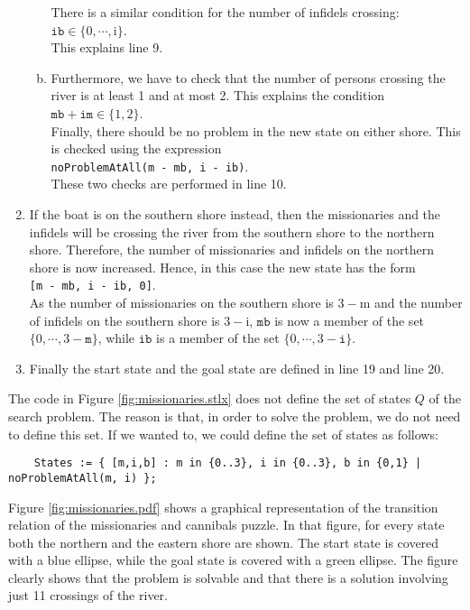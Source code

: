 \begin{enumerate}
\begin{enumerate}[(a)]
            There is a similar condition for the number of infidels crossing:
            \\[0.2cm]
            \hspace*{1.3cm}
            $\mathtt{ib} \in \{0,\cdots,\mathrm{i}\}$.
            \\[0.2cm]
            This explains line 9.
      \item Furthermore, we have to check that the number of persons crossing the river is at least 1
            and at most 2.  This explains the condition
            \\[0.2cm]
            \hspace*{1.3cm}
            $\mathtt{mb} + \mathtt{im} \in \{1,2\}$.
            \\[0.2cm]
            Finally, there should be no problem in the new state on either shore.  This is checked
            using the expression
            \\[0.2cm]
            \hspace*{1.3cm}
            \texttt{noProblemAtAll(m - mb, i - ib)}.
            \\[0.2cm]
            These two checks are performed in line 10.
      \end{enumerate}
\item If the boat is on the southern shore instead, then the missionaries and the infidels will be crossing
      the river from the southern shore to the northern shore.  Therefore, the number of missionaries and
      infidels on the northern shore is now increased.  Hence, in this case the new state has the form
      \\[0.2cm]
      \hspace*{1.3cm}
      \texttt{[m - mb, i - ib, 0]}.
      \\[0.2cm]
      As the number of missionaries on the southern shore is $3 - \mathrm{m}$ and the number of infidels on the
      southern shore is $3 - \mathrm{i}$, $\mathtt{mb}$ is now a member of the set $\{0,\cdots,3 -\mathtt{m}\}$, while 
      $\mathtt{ib}$ is a member of the set $\{0,\cdots,3 - \mathtt{i}\}$.
\item Finally the start state and the goal state are defined in line 19 and line 20.
\end{enumerate}
The code in Figure \ref{fig:missionaries.stlx} does not define the set of states $Q$ of the search problem.  The
reason is that, in order to solve the problem, we do not need to define this set.  If we wanted to, we could
define the set of states as follows: 
\begin{verbatim}
    States := { [m,i,b] : m in {0..3}, i in {0..3}, b in {0,1} | noProblemAtAll(m, i) };
\end{verbatim}
Figure \ref{fig:missionaries.pdf} shows a graphical representation of the transition relation of the
missionaries and cannibals puzzle.  In that figure, for every state both the northern and the
eastern shore are shown.  The start state is covered with a blue ellipse, while the goal state is
covered with a green ellipse.  The figure clearly shows that the problem is solvable and that there
is a solution involving just 11 crossings of the river.
\eox

